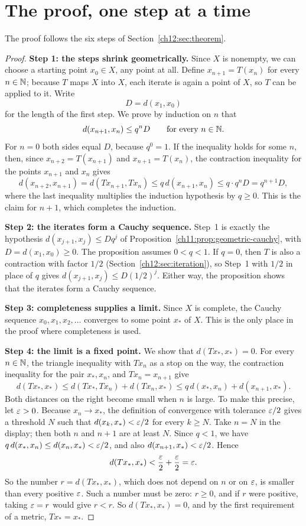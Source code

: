 \section{The proof, one step at a time}\label{ch12:sec:proof}
The proof follows the six steps of Section~\ref{ch12:sec:theorem}.

\begin{proof}
\textbf{Step 1: the steps shrink geometrically.} Since $X$ is nonempty, we can choose a starting point $x_0\in X$, any point at all. Define $x_{n+1}=T(x_n)$ for every $n\in\mathbb N$; because $T$ maps $X$ into $X$, each iterate is again a point of $X$, so $T$ can be applied to it. Write
\[
D=d(x_1,x_0)
\]
for the length of the first step. We prove by induction on $n$ that
\[
d(x_{n+1},x_n)\le q^nD\qquad\text{for every }n\in\mathbb N.
\]
For $n=0$ both sides equal $D$, because $q^0=1$. If the inequality holds for some $n$, then, since $x_{n+2}=T(x_{n+1})$ and $x_{n+1}=T(x_n)$, the contraction inequality for the points $x_{n+1}$ and $x_n$ gives
\[
d(x_{n+2},x_{n+1})=d(Tx_{n+1},Tx_n)
\le q\,d(x_{n+1},x_n)\le q\cdot q^nD=q^{n+1}D,
\]
where the last inequality multiplies the induction hypothesis by $q\ge0$. This is the claim for $n+1$, which completes the induction.

\textbf{Step 2: the iterates form a Cauchy sequence.} Step~1 is exactly the hypothesis $d(x_{j+1},x_j)\le Dq^j$ of Proposition~\ref{ch11:prop:geometric-cauchy}, with $D=d(x_1,x_0)\ge0$. The proposition assumes $0<q<1$. If $q=0$, then $T$ is also a contraction with factor $1/2$ (Section~\ref{ch12:sec:iteration}), so Step~1 with $1/2$ in place of $q$ gives $d(x_{j+1},x_j)\le D(1/2)^j$. Either way, the proposition shows that the iterates form a Cauchy sequence.

\textbf{Step 3: completeness supplies a limit.} Since $X$ is complete, the Cauchy sequence $x_0,x_1,x_2,\ldots$ converges to some point $x_*$ of $X$. This is the only place in the proof where completeness is used.

\textbf{Step 4: the limit is a fixed point.} We show that $d(Tx_*,x_*)=0$. For every $n\in\mathbb N$, the triangle inequality with $Tx_n$ as a stop on the way, the contraction inequality for the pair $x_*,x_n$, and $Tx_n=x_{n+1}$ give
\[
d(Tx_*,x_*)\le d(Tx_*,Tx_n)+d(Tx_n,x_*)
\le q\,d(x_*,x_n)+d(x_{n+1},x_*).
\]
Both distances on the right become small when $n$ is large. To make this precise, let $\varepsilon>0$. Because $x_n\to x_*$, the definition of convergence with tolerance $\varepsilon/2$ gives a threshold $N$ such that $d(x_k,x_*)<\varepsilon/2$ for every $k\ge N$. Take $n=N$ in the display; then both $n$ and $n+1$ are at least $N$. Since $q<1$, we have $q\,d(x_*,x_n)\le d(x_n,x_*)<\varepsilon/2$, and also $d(x_{n+1},x_*)<\varepsilon/2$. Hence
\[
d(Tx_*,x_*)<\frac{\varepsilon}2+\frac{\varepsilon}2=\varepsilon.
\]
So the number $r=d(Tx_*,x_*)$, which does not depend on $n$ or on $\varepsilon$, is smaller than every positive $\varepsilon$. Such a number must be zero: $r\ge0$, and if $r$ were positive, taking $\varepsilon=r$ would give $r<r$. So $d(Tx_*,x_*)=0$, and by the first requirement of a metric, $Tx_*=x_*$.


\end{proof}
